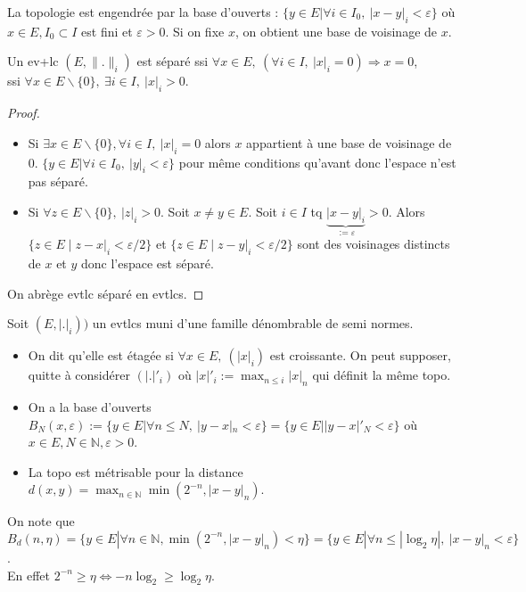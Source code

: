 La topologie est engendrée par la base d'ouverts : $\{y\in E|\forall i\in I_0,\ |x-y|_i<\varepsilon  \} $ où $x\in E, I_0\subset I$ est fini et $\varepsilon >0$. Si on fixe $x$, on obtient une base de voisinage de $x$.

\begin{lemme}
    Un ev+lc $(E,\|.\|_i)$ est séparé ssi $\forall x\in E, \ (\forall i\in I,\ |x|_i=0)\Rightarrow x=0  $, \\
    ssi $\forall x\in E\backslash \{0\} ,\ \exists i\in I,\ |x|_i>0. $
\end{lemme}
\begin{proof}
    \begin{itemize}
        \item Si $\exists x\in E\backslash \{0\} ,\forall i\in I, \ |x|_i=0 $ alors $x$ appartient à une base de voisinage de $0$. $\{y\in E|\forall i\in I_0,\ |y|_i<\varepsilon  \} $ pour même conditions qu'avant donc l'espace n'est pas séparé.
        \item Si $\forall z\in E\backslash \{0\} ,\ |z|_i>0 $. Soit $x\neq y\in E$. Soit $i\in I$ tq $\underbrace{|x-y|_i}_{:=\varepsilon} >0$. Alors $\{z\in E\mid z-x|_i<\varepsilon /2\} $ et $\{z\in E\mid z-y|_i<\varepsilon /2\} $ sont des voisinages distincts de $x$ et $y$ donc l'espace est séparé.
    \end{itemize}
    On abrège evtlc séparé en evtlcs.
\end{proof}

Soit $(E,|.|_i))$ un evtlcs muni d'une famille dénombrable de semi normes.
\begin{itemize}
    \item On dit qu'elle est étagée si $\forall x\in E,\ (|x|_i) $ est croissante. On peut supposer, quitte à considérer $(|.|'_i)$ où $|x|'_i:=\max_{n\le i }|x|_n$ qui définit la même topo.
    \item On a la base d'ouverts $B_N(x,\varepsilon ):=\{y\in E|\forall n\le N,\ |y-x|_n<\varepsilon  \} =\{y\in E| |y-x|'_N<\varepsilon \} $ où $x\in E, N\in \mathbb{N} ,\varepsilon >0$.
    \item La topo est métrisable pour la distance $d(x,y)=\max_{n\in \mathbb{N} }\min(2^{-n}, |x-y|_n)$.
\end{itemize}

On note que $B_d(n, \eta)=\{y\in E| \forall n\in \mathbb{N} , \min(2^{-n},|x-y|_n)< \eta\} =\{y\in E| \forall n\le |\log_2\eta|,\ |x-y|_n<\varepsilon  \} $.\\
En effet $2^{-n}\ge \eta\Leftrightarrow -n\log_2\ge  \log_2\eta$.\\

